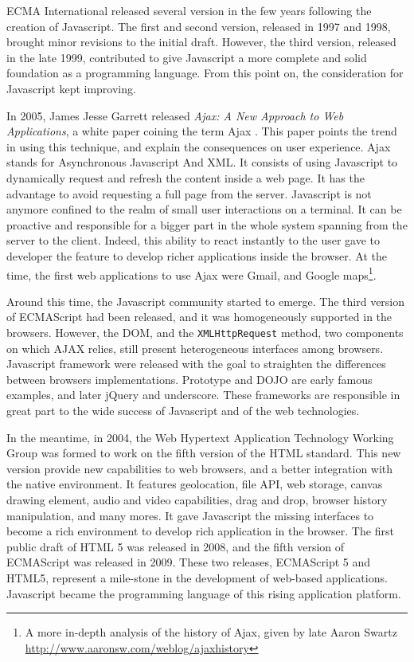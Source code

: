 ECMA International released several version in the few years following the creation of Javascript.
The first and second version, released in 1997 and 1998, brought minor revisions to the initial draft.
However, the third version, released in the late 1999, contributed to give Javascript a more complete and solid foundation as a programming language.
From this point on, the consideration for Javascript kept improving.

In 2005, James Jesse Garrett released \textit{Ajax: A New Approach to Web Applications}, a white paper coining the term Ajax \cite{Garrett2005}.
This paper points the trend in using this technique, and explain the consequences on user experience.
Ajax stands for Asynchronous Javascript And XML.
It consists of using Javascript to dynamically request and refresh the content inside a web page.
It has the advantage to avoid requesting a full page from the server.
Javascript is not anymore confined to the realm of small user interactions on a terminal.
It can be proactive and responsible for a bigger part in the whole system spanning from the server to the client.
Indeed, this ability to react instantly to the user gave to developer the feature to develop richer applications inside the browser.
At the time, the first web applications to use Ajax were Gmail, and Google maps\footnote{A more in-depth analysis of the history of Ajax, given by late Aaron Swartz \url{http://www.aaronsw.com/weblog/ajaxhistory}}.

Around this time, the Javascript community started to emerge.
The third version of ECMAScript had been released, and it was homogeneously supported in the browsers.
However, the DOM, and the \texttt{XMLHttpRequest} method, two components on which AJAX relies, still present heterogeneous interfaces among browsers.
Javascript framework were released with the goal to straighten the differences between browsers implementations.
Prototype and DOJO are early famous examples, and later jQuery and underscore.
These frameworks are responsible in great part to the wide success of Javascript and of the web technologies.

In the meantime, in 2004, the Web Hypertext Application Technology Working Group was formed to work on the fifth version of the HTML standard.
This new version provide new capabilities to web browsers, and a better integration with the native environment.
It features geolocation, file API, web storage, canvas drawing element, audio and video capabilities, drag and drop, browser history manipulation, and many mores.
It gave Javascript the missing interfaces to become a rich environment to develop rich application in the browser.
The first public draft of HTML 5 was released in 2008, and the fifth version of ECMAScript was released in 2009.
These two releases, ECMAScript 5 and HTML5, represent a mile-stone in the development of web-based applications.
Javascript became the programming language of this rising application platform.

